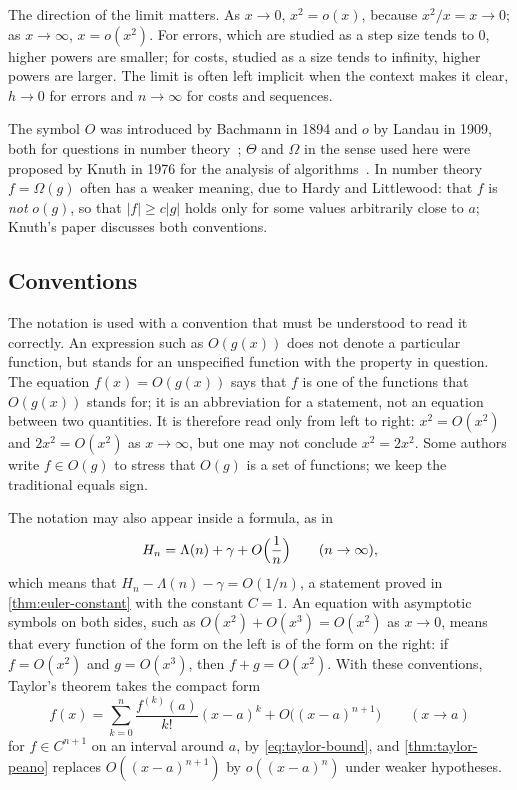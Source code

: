 The direction of the limit matters. As $x\to0$, $x^2=o(x)$, because $x^2/x=x\to0$; as $x\to\infty$, $x=o(x^2)$. For errors, which are studied as a step size tends to $0$, higher powers are smaller; for costs, studied as a size tends to infinity, higher powers are larger. The limit is often left implicit when the context makes it clear, $h\to0$ for errors and $n\to\infty$ for costs and sequences.

The symbol $O$ was introduced by Bachmann in 1894 and $o$ by Landau in 1909, both for questions in number theory~\cite{bachmann1894,landau1909}; $\Theta$ and $\Omega$ in the sense used here were proposed by Knuth in 1976 for the analysis of algorithms~\cite{knuth1976bigomega}. In number theory $f=\Omega(g)$ often has a weaker meaning, due to Hardy and Littlewood: that $f$ is \emph{not} $o(g)$, so that $|f|\ge c|g|$ holds only for some values arbitrarily close to $a$; Knuth's paper discusses both conventions.

\subsection{Conventions}

The notation is used with a convention that must be understood to read it correctly. An expression such as $O(g(x))$ does not denote a particular function, but stands for an unspecified function with the property in question. The equation $f(x)=O(g(x))$ says that $f$ is one of the functions that $O(g(x))$ stands for; it is an abbreviation for a statement, not an equation between two quantities. It is therefore read only from left to right: $x^2=O(x^2)$ and $2x^2=O(x^2)$ as $x\to\infty$, but one may not conclude $x^2=2x^2$. Some authors write $f\in O(g)$ to stress that $O(g)$ is a set of functions; we keep the traditional equals sign.

The notation may also appear inside a formula, as in
\[
H_n=\Lambda(n)+\gamma+O\Bigl(\frac1n\Bigr)\qquad(n\to\infty),
\]
which means that $H_n-\Lambda(n)-\gamma=O(1/n)$, a statement proved in \cref{thm:euler-constant} with the constant $C=1$. An equation with asymptotic symbols on both sides, such as $O(x^2)+O(x^3)=O(x^2)$ as $x\to0$, means that every function of the form on the left is of the form on the right: if $f=O(x^2)$ and $g=O(x^3)$, then $f+g=O(x^2)$. With these conventions, Taylor's theorem takes the compact form
\[
f(x)=\sum_{k=0}^n\frac{f^{(k)}(a)}{k!}(x-a)^k+O\bigl((x-a)^{n+1}\bigr)\qquad(x\to a)
\]
for $f\in C^{n+1}$ on an interval around $a$, by \eqref{eq:taylor-bound}, and \cref{thm:taylor-peano} replaces $O((x-a)^{n+1})$ by $o((x-a)^n)$ under weaker hypotheses.

